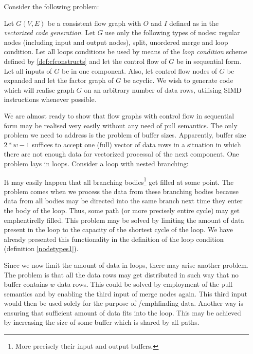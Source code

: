 
Consider the following problem:

      Let $G(V,E)$ be a consistent flow graph with $O$ and $I$ defined as in the \emph{vectorized code generation}. Let $G$ use only the following types of nodes: regular nodes (including input and output nodes), split, unordered merge and loop condition. Let all loops conditions be used by means of the \emph{loop condition} scheme defined by \ref{def:cfconstructs} and let the control flow of $G$ be in sequential form. Let all inputs of $G$ be in one component. Also, let control flow nodes of $G$ be expanded and let the factor graph of $G$ be acyclic. We wish to generate code which will realise graph $G$ on an arbitrary number of data rows, utilising SIMD instructions whenever possible. 
\myendprob

  We are almost ready to show that flow graphs with control flow in sequential form may be realised very easily without any need of pull semantics. The only problem we need to address is the problem of buffer sizes. Apparently, buffer size $2*w-1$ suffices to accept one (full) vector of data rows in a situation in which there are not enough data for vectorized processal of the next component. One problem lays in loops.  Consider a loop with nested branching:


  It may easily happen that all branching bodies\footnote{More precisely their input and output buffers.} get filled at some point. The problem comes when we process the data from these branching bodies because data from all bodies may be directed into the same branch next time they enter the body of the loop. Thus, some path (or more precisely entire cycle) may get emph{entirelly} filled. This problem may be solved by limiting the amount of data present in the loop to the capacity of the shortest cycle of the loop. We have already presented this functionality in the definition of the loop condition (definition \ref{nodetypes1}). 

  Since we now limit the amount of data in loops, there may arise another problem. The problem is that all the data rows may get distributed in such way that no buffer contains $w$ data rows. This could be solved by employment of the pull semantics and by enabling the third input of merge nodes again. This third input would then be used solely for the purpose of /emph{finding} data. Another way is ensuring that sufficient amount of data fits into the loop. This may be achieved by increasing the size of some buffer which is shared by all paths.

